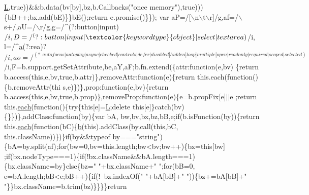 \begin{DoxyCode}
      \hyperlink{jquery_8js_a38ee4c0b5f4fe2a18d0c783af540d253}{L},\textcolor{keyword}{true}))&&b.data(bv[by],bz,b.Callbacks(\textcolor{stringliteral}{"once memory"}),\textcolor{keyword}{true})))\{bB++;bx.add(bE)\}\}bE();\textcolor{keywordflow}{return} e.promise()\}\});
      var aP=/[\(\backslash\)n\(\backslash\)t\(\backslash\)r]/g,af=/\(\backslash\)s+/,aU=/\(\backslash\)r/g,g=/^(?:button|input)$/i,D=/^(?:button|input|\textcolor{keywordtype}{object}|select|textarea)$/i,
      l=/^\hyperlink{jquery_8js_aa4d4888597588a84fd5b1184d00c91f3}{a}(?:rea)?$/i,ao=/^(?:autofocus|autoplay|async|checked|controls|defer|disabled|hidden|loop|multiple|open
      |readonly|required|scoped|selected)$/i,F=b.support.getSetAttribute,be,aY,aF;b.fn.extend(\{attr:function(e,bv)
      \{return b.access(this,e,bv,true,b.attr)\},removeAttr:\textcolor{keyword}{function}(e)\{return this.each(function()\{b.removeAttr(thi
      s,e)\})\},prop:\textcolor{keyword}{function}(e,bv)\{\textcolor{keywordflow}{return} b.access(\textcolor{keyword}{this},e,bv,\textcolor{keyword}{true},b.prop)\},removeProp:\textcolor{keyword}{function}(e)\{e=b.propFix[e]||e
      ;\textcolor{keywordflow}{return} this.\hyperlink{jquery_8js_a871ff39db627c54c710a3e9909b8234c}{each}(\textcolor{keyword}{function}()\{\textcolor{keywordflow}{try}\{\textcolor{keyword}{this}[e]=\hyperlink{jquery_8js_a38ee4c0b5f4fe2a18d0c783af540d253}{L};\textcolor{keyword}{delete} \textcolor{keyword}{this}[e]\}\textcolor{keywordflow}{catch}(bv)\{\}\})\},addClass:\textcolor{keyword}{function}(by)\{var bA,
      bw,bv,bx,bz,bB,e;\textcolor{keywordflow}{if}(b.isFunction(by))\{\textcolor{keywordflow}{return} this.\hyperlink{jquery_8js_a871ff39db627c54c710a3e9909b8234c}{each}(\textcolor{keyword}{function}(bC)\{\hyperlink{jquery_8js_aa4026ad5544b958e54ce5e106fa1c805}{b}(\textcolor{keyword}{this}).addClass(by.call(\textcolor{keyword}{this},bC,\textcolor{keyword}{
      this}.className))\})\}\textcolor{keywordflow}{if}(by&&typeof by===\textcolor{stringliteral}{"string"})\{bA=by.split(af);\textcolor{keywordflow}{for}(bw=0,bv=this.length;bw<bv;bw++)\{bx=\textcolor{keyword}{this}[bw]
      ;\textcolor{keywordflow}{if}(bx.nodeType===1)\{\textcolor{keywordflow}{if}(!bx.className&&bA.length===1)\{bx.className=by\}\textcolor{keywordflow}{else}\{bz=\textcolor{stringliteral}{" "}+bx.className+\textcolor{stringliteral}{" "};\textcolor{keywordflow}{for}(bB=0,
      e=bA.length;bB<e;bB++)\{\textcolor{keywordflow}{if}(!~bz.indexOf(\textcolor{stringliteral}{" "}+bA[bB]+\textcolor{stringliteral}{" "}))\{bz+=bA[bB]+\textcolor{stringliteral}{" "}\}\}bx.className=b.trim(bz)\}\}\}\}\textcolor{keywordflow}{return} \textcolor{keyword}{
}
\end{DoxyCode}
